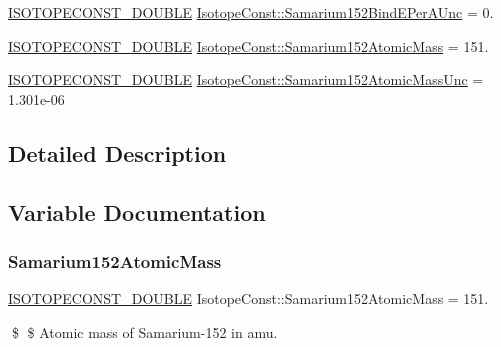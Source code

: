 \begin{DoxyCompactItemize}
\mbox{\hyperlink{group___isotope_const-_macros_ga8f45a7272ce02c0b4c65c44636ed719a}{I\+S\+O\+T\+O\+P\+E\+C\+O\+N\+S\+T\+\_\+\+D\+O\+U\+B\+LE}} \mbox{\hyperlink{group___isotope_const-_samarium-_sm152_ga91d59cc739e06bdd2a8469ef216bcd71}{Isotope\+Const\+::\+Samarium152\+Bind\+E\+Per\+A\+Unc}} = 0.
\item 
\mbox{\hyperlink{group___isotope_const-_macros_ga8f45a7272ce02c0b4c65c44636ed719a}{I\+S\+O\+T\+O\+P\+E\+C\+O\+N\+S\+T\+\_\+\+D\+O\+U\+B\+LE}} \mbox{\hyperlink{group___isotope_const-_samarium-_sm152_ga3bdf84922ef0b27c116486dabbb21459}{Isotope\+Const\+::\+Samarium152\+Atomic\+Mass}} = 151.
\item 
\mbox{\hyperlink{group___isotope_const-_macros_ga8f45a7272ce02c0b4c65c44636ed719a}{I\+S\+O\+T\+O\+P\+E\+C\+O\+N\+S\+T\+\_\+\+D\+O\+U\+B\+LE}} \mbox{\hyperlink{group___isotope_const-_samarium-_sm152_gaaf85c4d8d4b6175599e266a3e2c4faed}{Isotope\+Const\+::\+Samarium152\+Atomic\+Mass\+Unc}} = 1.\+301e-\/06
\end{DoxyCompactItemize}


\subsection{Detailed Description}


\subsection{Variable Documentation}
\mbox{\label{group___isotope_const-_samarium-_sm152_ga3bdf84922ef0b27c116486dabbb21459}} 
\subsubsection{\texorpdfstring{Samarium152\+Atomic\+Mass}{Samarium152AtomicMass}}
{\footnotesize\ttfamily \mbox{\hyperlink{group___isotope_const-_macros_ga8f45a7272ce02c0b4c65c44636ed719a}{I\+S\+O\+T\+O\+P\+E\+C\+O\+N\+S\+T\+\_\+\+D\+O\+U\+B\+LE}} Isotope\+Const\+::\+Samarium152\+Atomic\+Mass = 151.}

\$ \$ Atomic mass of Samarium-\/152 in amu. \mbox{\label{group___isotope_const-_samarium-_sm152_gaaf85c4d8d4b6175599e266a3e2c4faed}} 

